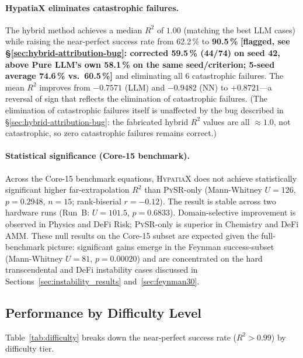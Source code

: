 \documentclass[twoside,11pt]{article}
\newcommand{\Rsq}{R^{2}}
\begin{document}
\paragraph{HypatiaX eliminates catastrophic failures.}
The hybrid method achieves a median $\Rsq$ of $1.00$ (matching the best LLM cases)
while raising the near-perfect success rate from 62.2\,\% to \textbf{90.5\,\%}
\textbf{[flagged, see \S\ref{sec:hybrid-attribution-bug}: corrected 59.5\,\%
(44/74) on seed 42, above Pure LLM's own 58.1\,\% on the same
seed/criterion; 5-seed average 74.6\,\% vs.\ 60.5\,\%]}
and eliminating all 6 catastrophic failures.  The mean $\Rsq$ improves from
$-0.7571$ (LLM) and $-0.9482$ (NN) to $+0.8721$---a reversal of sign that reflects
the elimination of catastrophic failures. (The elimination of catastrophic
failures itself is unaffected by the bug described in
\S\ref{sec:hybrid-attribution-bug}: the fabricated hybrid $\Rsq$ values are all
$\approx 1.0$, not catastrophic, so zero catastrophic failures remains correct.)

\paragraph{Statistical significance (Core-15 benchmark).}
Across the Core-15 benchmark equations, \textsc{HypatiaX} does not achieve
statistically significant higher far-extrapolation $\Rsq$ than \textsc{PySR}-only
(Mann-Whitney $U=126$, $p=0.2948$, $n=15$; rank-biserial $r=-0.12$).  The result
is stable across two hardware runs (Run~B: $U=101.5$, $p=0.6833$).
Domain-selective improvement is observed in Physics and DeFi Risk;
\textsc{PySR}-only is superior in Chemistry and DeFi AMM.
These null results on the Core-15 subset are expected given the full-benchmark
picture: significant gains emerge in the Feynman success-subset
(Mann-Whitney $U=81$, $p=0.00020$) and are concentrated on the hard transcendental
and DeFi instability cases discussed in Sections~\ref{sec:instability_results}
and~\ref{sec:feynman30}.

\subsection{Performance by Difficulty Level}\label{subsec:performance-by-difficulty-level}
\label{sec:difficulty}

Table~\ref{tab:difficulty} breaks down the near-perfect success rate ($\Rsq > 0.99$)
by difficulty tier.
\end{document}
